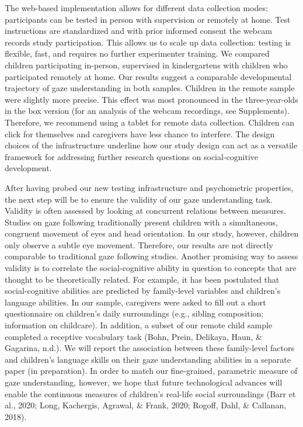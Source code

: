 \documentclass[
  man,floatsintext]{apa6}
\begin{document}
The web-based implementation allows for different data collection modes: participants can be tested in person with supervision or remotely at home.
Test instructions are standardized and with prior informed consent the webcam records study participation.
This allows us to scale up data collection: testing is flexible, fast, and requires no further experimenter training.
We compared children participating in-person, supervised in kindergartens with children who participated remotely at home.
Our results suggest a comparable developmental trajectory of gaze understanding in both samples.
Children in the remote sample were slightly more precise.
This effect was most pronounced in the three-year-olds in the box version (for an analysis of the webcam recordings, see Supplements).
Therefore, we recommend using a tablet for remote data collection.
Children can click for themselves and caregivers have less chance to interfere.
The design choices of the infrastructure underline how our study design can act as a versatile framework for addressing further research questions on social-cognitive development.

After having probed our new testing infrastructure and psychometric properties, the next step will be to ensure the validity of our gaze understanding task.
Validity is often assessed by looking at concurrent relations between measures.
Studies on gaze following traditionally present children with a simultaneous, congruent movement of eyes and head orientation.
In our study, however, children only observe a subtle eye movement.
Therefore, our results are not directly comparable to traditional gaze following studies.
Another promising way to assess validity is to correlate the social-cognitive ability in question to concepts that are thought to be theoretically related.
For example, it has been postulated that social-cognitive abilities are predicted by family-level variables and children's language abilities.
In our sample, caregivers were asked to fill out a short questionnaire on children's daily surroundings (e.g., sibling composition; information on childcare).
In addition, a subset of our remote child sample completed a receptive vocabulary task (Bohn, Prein, Delikaya, Haun, \& Gagarina, n.d.). We will report the association between these family-level factors and children's language skills on their gaze understanding abilities in a separate paper (in preparation). In order to match our fine-grained, parametric measure of gaze understanding, however, we hope that future technological advances will enable the continuous measures of children's real-life social surroundings (Barr et al., 2020; Long, Kachergis, Agrawal, \& Frank, 2020; Rogoff, Dahl, \& Callanan, 2018).
\end{document}
